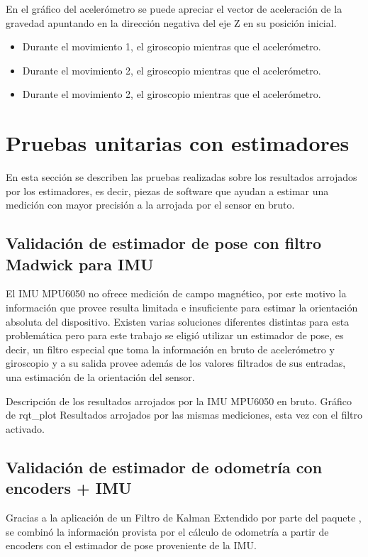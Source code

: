 En el gráfico del acelerómetro se puede apreciar el vector de aceleración de la gravedad apuntando en la dirección negativa del eje Z en su posición inicial.
\begin{itemize}
    \item Durante el movimiento 1, el giroscopio mientras que el acelerómetro.
    \item Durante el movimiento 2, el giroscopio mientras que el acelerómetro.
    \item Durante el movimiento 2, el giroscopio mientras que el acelerómetro.
\end{itemize}

\section{Pruebas unitarias con estimadores}

En esta sección se describen las pruebas realizadas sobre los resultados arrojados por los estimadores, es decir, piezas de software que ayudan a estimar una medición con mayor precisión a la arrojada por el sensor en bruto.

\subsection{Validación de estimador de pose con filtro Madwick para IMU}

El IMU MPU6050 no ofrece medición de campo magnético, por este motivo la información que provee resulta limitada e insuficiente para estimar la orientación absoluta del dispositivo.
Existen varias soluciones diferentes distintas para esta problemática pero para este trabajo se eligió utilizar un estimador de pose, es decir, un filtro especial que toma la información en bruto de acelerómetro y giroscopio y a su salida provee además de los valores filtrados de sus entradas, una estimación de la orientación del sensor.

Descripción de los resultados arrojados por la IMU MPU6050 en bruto. Gráfico de rqt\_plot
Resultados arrojados por las mismas mediciones, esta vez con el filtro activado.

\subsection{Validación de estimador de odometría con encoders + IMU}

Gracias a la aplicación de un Filtro de Kalman Extendido por parte del paquete , se combinó la información provista por el cálculo de odometría a partir de encoders con el estimador de pose proveniente de la IMU.

